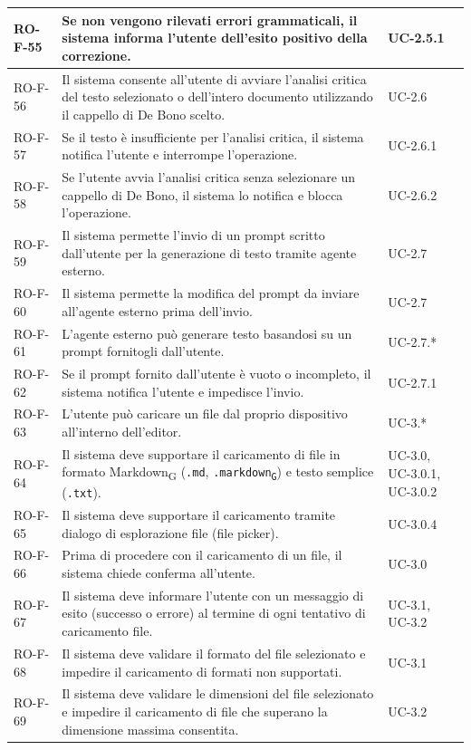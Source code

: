 \documentclass[11pt,a4paper]{article}
\newcommand{\gls}[1]{#1\textsubscript{G}}
\begin{document}
\begin{longtable}{|p{}|>{\raggedright\arraybackslash}p{}|p{}|}
\hline
RO-F-55 & Se non vengono rilevati errori grammaticali, il sistema informa l'utente dell'esito positivo della correzione. & UC-2.5.1 \\
\hline
RO-F-56 & Il sistema consente all'utente di avviare l'analisi critica del testo selezionato o dell'intero documento utilizzando il cappello di De Bono scelto. & UC-2.6 \\
\hline
RO-F-57 & Se il testo è insufficiente per l'analisi critica, il sistema notifica l'utente e interrompe l'operazione. & UC-2.6.1 \\
\hline
RO-F-58 & Se l'utente avvia l'analisi critica senza selezionare un cappello di De Bono, il sistema lo notifica e blocca l'operazione. & UC-2.6.2 \\
\hline
RO-F-59 & Il sistema permette l'invio di un prompt scritto dall'utente per la generazione di testo tramite agente esterno. & UC-2.7 \\
\hline
RO-F-60 & Il sistema permette la modifica del prompt da inviare all'agente esterno prima dell'invio. & UC-2.7 \\
\hline
RO-F-61 & L'agente esterno può generare testo basandosi su un prompt fornitogli dall'utente. & UC-2.7.* \\
\hline
RO-F-62 & Se il prompt fornito dall'utente è vuoto o incompleto, il sistema notifica l'utente e impedisce l'invio. & UC-2.7.1 \\
\hline
RO-F-63 & L'utente può caricare un file dal proprio dispositivo all'interno dell'editor. & UC-3.* \\
\hline
RO-F-64 & Il sistema deve supportare il caricamento di file in formato \gls{Markdown} (\texttt{.md}, \texttt{.\gls{markdown}}) e testo semplice (\texttt{.txt}). & UC-3.0, UC-3.0.1, UC-3.0.2 \\
\hline
RO-F-65 & Il sistema deve supportare il caricamento tramite dialogo di esplorazione file (file picker). & UC-3.0.4 \\
\hline
RO-F-66 & Prima di procedere con il caricamento di un file, il sistema chiede conferma all'utente. & UC-3.0 \\
\hline
RO-F-67 & Il sistema deve informare l'utente con un messaggio di esito (successo o errore) al termine di ogni tentativo di caricamento file. & UC-3.1, UC-3.2 \\
\hline
RO-F-68 & Il sistema deve validare il formato del file selezionato e impedire il caricamento di formati non supportati. & UC-3.1 \\
\hline
RO-F-69 & Il sistema deve validare le dimensioni del file selezionato e impedire il caricamento di file che superano la dimensione massima consentita. & UC-3.2 \\

\end{longtable}
\end{document}
